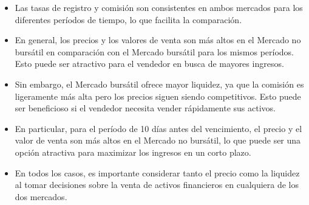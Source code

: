 \begin{itemize}
  \item Las tasas de registro y comisión son consistentes en ambos mercados para los diferentes períodos de tiempo, lo que facilita la comparación.
  \item En general, los precios y los valores de venta son más altos en el Mercado no bursátil en comparación con el Mercado bursátil para los mismos períodos. Esto puede ser atractivo para el vendedor en busca de mayores ingresos.
  \item Sin embargo, el Mercado bursátil ofrece mayor liquidez, ya que la comisión es ligeramente más alta pero los precios siguen siendo competitivos. Esto puede ser beneficioso si el vendedor necesita vender rápidamente sus activos.
  \item En particular, para el período de 10 días antes del vencimiento, el precio y el valor de venta son más altos en el Mercado no bursátil, lo que puede ser una opción atractiva para maximizar los ingresos en un corto plazo.
  \item En todos los casos, es importante considerar tanto el precio como la liquidez al tomar decisiones sobre la venta de activos financieros en cualquiera de los dos mercados.  \newline
\end{itemize}
  